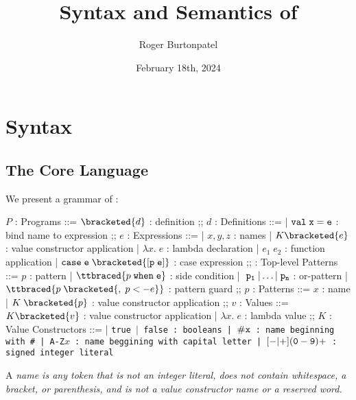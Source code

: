 \documentclass[]{article}
\title{Syntax and Semantics of \PPlus}
\author{Roger Burtonpatel}
\date{February 18th, 2024}
\begin{document}
\maketitle

\section{Syntax}

\subsection{The Core Language}

We present a grammar of \PPlus: 

\bigskip

\begin{center}
    \begin{bnf}
    $P$ : \textsf{Programs} ::=
    $\bracketed{d}$ : definition
    ;;
    $d$ : \textsf{Definitions} ::=
    | $\tt{val} \; x \; \tt{=} \; e$ : bind name to expression
    ;;
    $e$ : Expressions ::= 
    | $x, y, z$ : names
    | $K\bracketed{e}$ : value constructor application 
    | $\lambda x. \; e$ : lambda declaration  
    | $e_{1} \; e_{2}$ : function application 
    | $\tt{case} \; e \; \bracketed{\tt{[} p \; e \tt{]}}$ : case expression 
    ;;
    \tlp : \textsf{Top-level Patterns} ::= $p$ : pattern 
    | $\ttbraced{p \; \tt{when} \; e }$ : side condition
    | $\tt \; p_{1} \; \vert \dots \vert \; p_{n}$ : or-pattern 
    | $\ttbraced{p \; \bracketed{, \; p <- e}}$ : pattern guard
    ;;
    $p$ : \textsf{Patterns} ::= $x$ : name 
    | $K \; \bracketed{p}$ : value constructor application 
    ;;
    $v$ : Values ::= $K\bracketed{v}$ : value constructor application 
    | $\lambda x. \; e$ : lambda value 
    ;;
    $K$ : \textsf{Value Constructors} ::=
    | \tt{true} $\vert$ \tt{false} : booleans
    | $\tt{\#}x$ : name beginning with \tt{\#}
    | \tt{A-Z}$x$ : name beggining with capital letter
    | $[\tt{-}\vert\tt{+}](\tt{0}-\tt{9})+$ : signed integer literal 
    \end{bnf}
\end{center}


A \it{name} is any token that is not an integer literal, 
does not contain whitespace, a bracket, or parenthesis, 
and is not a value constructor name or a reserved word.
\end{document}
